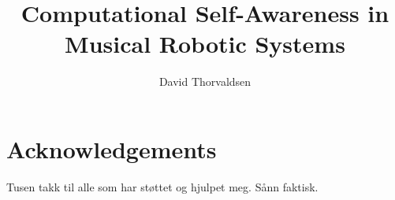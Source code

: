 \title{Computational Self-Awareness in Musical Robotic Systems} %
\author{David Thorvaldsen}
\duoforside[dept={Institute for Informatics}, program={Informatics: Robotics and Intelligent Systems}, long]

\newpage

\chapter*{Acknowledgements} %
Tusen takk til alle som har støttet og hjulpet meg. Sånn faktisk.
\newpage

\tableofcontents
\newpage

\listoftables
\newpage

\listoffigures
\newpage

\setcounter{page}{1}